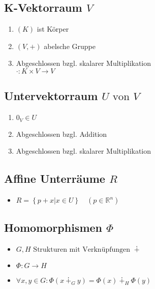 \documentclass[ngerman,11pt,a4paper
,pdftex]{article}
\newcommand{\f}[1]{$#1$}
\theoremstyle{nodot}
\theoremstyle{nodot}
\begin{document}
\begin{multicols*}{3}
\begin{tcolorbox}[colback=white,bottom=10pt, top=10pt]
            \subsection*{K-Vektorraum \f{V}}
            \begin{enumerate}
              \item \f{(K)} ist Körper
              \item \f{(V,+)} abelsche Gruppe
              \item Abgeschlossen bzgl. skalarer Multiplikation\\
              \f{\cdot : K\times V \rightarrow V}
            \end{enumerate}
            
            \subsection*{Untervektorraum \f{U \text{ von } V}}
            \begin{enumerate}
              \item \f{0_V \in U}
              \item Abgeschlossen bzgl. Addition
              \item Abgeschlossen bzgl. skalarer Multiplikation
            \end{enumerate}

            \subsection*{Affine Unterräume \f{R}}
            \begin{itemize}
              \item \f{R = \left\{p+x | x\in U\right\} \quad (p\in\mathbb{R}^n)}
            \end{itemize}
          \end{tcolorbox}

        \begin{tcolorbox}[colback=white,bottom=10pt, top=10pt]
          \subsection*{Homomorphismen \f{\Phi}}
          \begin{itemize}
            \item \f{G, H \text{ Strukturen mit Verknüpfungen } \dotplus}
            \item \f{\Phi:G\rightarrow H}
          \item \f{\forall x,y\in G: \Phi(x\dotplus _G y) = \Phi(x)\dotplus_H\Phi(y)}
          \end{itemize}
        \end{tcolorbox}


\end{multicols*}
\end{document}

